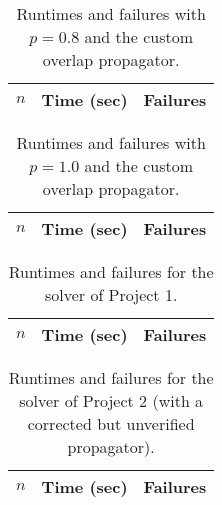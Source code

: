 \documentclass[a4paper,11pt]{article}
\begin{document}
\begin{table}[h]
\centering
\begin{tabular}{r|r|r}
$n$ & Time (sec) & Failures \\
\hline   
\end{tabular}
\caption{Runtimes and failures with $p = 0.8$ and the custom overlap propagator.} 
\end{table}

\begin{table}[h]
\centering
\begin{tabular}{r|r|r}
$n$ & Time (sec) & Failures \\
\hline   
\end{tabular}
\caption{Runtimes and failures with $p = 1.0$ and the custom overlap propagator.} 
\end{table}

\begin{table}[h]
\centering
\begin{tabular}{r|r|r}
$n$ & Time (sec) & Failures \\
\hline   
\end{tabular}
\caption{Runtimes and failures for the solver of Project 1.} 
\end{table}

\begin{table}[h]
\centering
\begin{tabular}{r|r|r}
$n$ & Time (sec) & Failures \\
\hline   
\end{tabular}
\caption{Runtimes and failures for the solver of Project 2 (with a corrected but unverified propagator).} 
\end{table}
\end{document}
